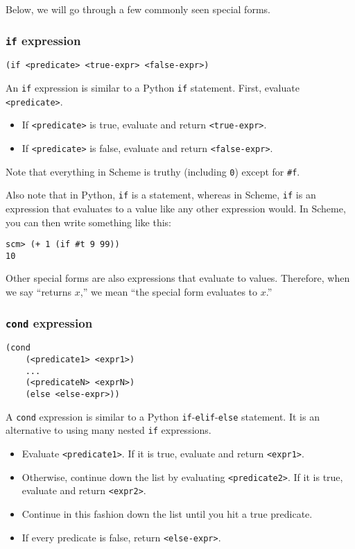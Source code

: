Below, we will go through a few commonly seen special forms. 

\subsubsection{\lstinline{if} expression}
\begin{lstlisting}
(if <predicate> <true-expr> <false-expr>)
\end{lstlisting}

An \lstinline{if} expression is similar to a Python \lstinline{if} statement. First, evaluate \lstinline{<predicate>}. 
\begin{itemize}
    \item If \lstinline{<predicate>} is true, evaluate and return \lstinline{<true-expr>}.
    \item If \lstinline{<predicate>} is false, evaluate and return \lstinline{<false-expr>}.
\end{itemize}
Note that everything in Scheme is truthy (including \lstinline{0}) except for \lstinline{#f}. 

Also note that in Python, \lstinline{if} is a statement, whereas in Scheme, \lstinline{if} is an expression that evaluates to a value like any other expression would. In Scheme, you can then write something like this:
\begin{lstlisting}
scm> (+ 1 (if #t 9 99))
10
\end{lstlisting}

Other special forms are also expressions that evaluate to values. 
Therefore, when we say ``returns $x$,'' we mean ``the special form evaluates to $x$.''

\subsubsection{\lstinline{cond} expression}

\begin{lstlisting}
(cond 
    (<predicate1> <expr1>) 
    ... 
    (<predicateN> <exprN>) 
    (else <else-expr>))
\end{lstlisting}

A \lstinline{cond} expression is similar to a Python \lstinline{if}-\lstinline{elif}-\lstinline{else} statement. It is an alternative to using many nested \lstinline{if} expressions. 

\begin{itemize}
    \item Evaluate \lstinline{<predicate1>}. If it is true, evaluate and return \lstinline{<expr1>}.
    \item Otherwise, continue down the list by evaluating \lstinline{<predicate2>}. If it is true, evaluate and return \lstinline{<expr2>}.
    \item Continue in this fashion down the list until you hit a true predicate.
    \item If every predicate is false, return \lstinline{<else-expr>}. 
\end{itemize}

